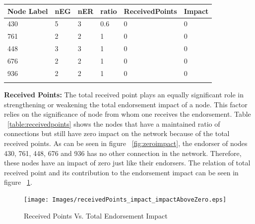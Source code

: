 \begin{tabularx}{\textwidth}{| X | X | X | X | X| X| }
  \hline
   \textbf{Node Label} & \textbf{nEG} & \textbf{nER} & \textbf{ratio} & \textbf{ReceivedPoints} & \textbf{Impact} \\
  \hline 
  430  & 5  & 3  & 0.6 & 0 & 0 \\
  \hline
   761 & 2  & 2  & 1 & 0 & 0 \\
  \hline
  448  & 3  & 3  & 1 & 0 & 0 \\
  \hline
  676  & 2  & 2  & 1 & 0 & 0 \\
  \hline
  936  & 2  & 2  & 1 & 0 & 0 \\
  \hline
  \caption{Nodes with Impact zero because of the receivedpoints}
  \label{table:receivedpoints}
\end{tabularx}

\textbf{Received Points:} The total received point plays an equally significant
role in strengthening or weakening the total endorsement impact of a node. This
factor relies on the significance of node from whom one receives the
endorsement. Table ~\ref{table:receivedpoints} shows the nodes that have a
maintained ratio of connections but still have zero impact on the network
because of the total received points. As can be seen in figure
~\ref{fig:zeroimpact}, the endorser of nodes 430, 761, 448, 676 and 936 has no
other connection in the network. Therefore, these nodes have an impact of zero
just like their endorsers. The relation of total received point and its
contribution to the endorsement impact can be seen in figure
~\ref{fig:receivedpointvsimpact}.
\begin{figure}[h]
	\texttt{[image: Images/receivedPoints\_impact\_impactAboveZero.eps]}
	\caption{Received Points Vs. Total Endorsement Impact}
	\label{fig:receivedpointvsimpact}
\end{figure}


